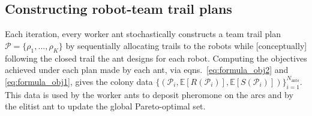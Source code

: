 \documentclass[fleqn,10pt,lineno]{wlpeerj}
\begin{document}
\subsection{Constructing robot-team trail plans}
Each iteration, every worker ant stochastically constructs a team trail plan $\mathcal{P}=\{\rho_1, ..., \rho_K\}$ by sequentially allocating trails to the robots while [conceptually] following the closed trail the ant designs for each robot. Computing the objectives achieved under each plan made by each ant, via eqns.~\ref{eq:formula_obj2} and \ref{eq:formula_obj1}, gives the colony data $\{ (\mathcal{P}_i, \mathbb{E}[R(\mathcal{P}_i)], \mathbb{E}[S(\mathcal{P}_i)])\}_{i=1}^{N_{\text{ants}}}$. This data is used by the worker ants to deposit pheromone on the arcs and by the elitist ant to update the global Pareto-optimal set.
\end{document}
